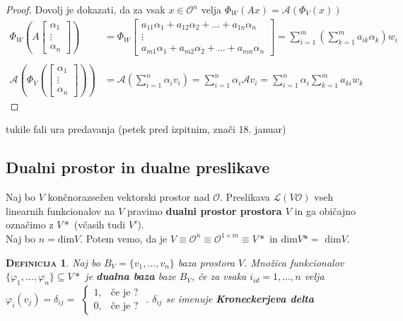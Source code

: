 \documentclass[a4paper,12pt]{article}
\newcommand{\OO}{\mathcal{O}}
\newcommand{\LL}{\mathcal{L}}
\newtheorem*{definicija}{\textsc{Definicija}}
\begin{document}
\begin{proof}
	Dovolj je dokazati, da za vsak $x\in \OO^n$ velja $\Phi_W(Ax)=\mathcal{A}(\Phi_V(x))$ \\

	\begin{align*}
		\Phi_W(A\begin{bmatrix} \alpha_1 \\ \vdots \\ \alpha_n \end{bmatrix}) &= \Phi_W
			\begin{bmatrix}
				a_{11}\alpha_1 + a_{12}\alpha_2+\ldots+a_{1n}\alpha_n \\
				\vdots \\
				a_{m1}\alpha_1+a_{m2}\alpha_2+\ldots+a_{mn}\alpha_n
			\end{bmatrix}
			= \sum_{i=1}^m(\sum_{k=1}^ma_{ik}\alpha_k)w_i \\
			& \\
		\mathcal{A}(\Phi_V(\begin{bmatrix} \alpha_1 \\ \vdots \\ \alpha_n \end{bmatrix})) &= \mathcal{A}(\sum_{i=1}^n\alpha_iv_i)=\sum_{i=1}^n \alpha_i\mathcal{A}v_i=\sum_{i=1}^n\alpha_i\sum_{k=1}^ma_{ki}w_k
	\end{align*}
	
\end{proof}

\newpage 

tukile fali ura predavanja (petek pred izpitnim, znači 18. januar)

\newpage 

\subsection{Dualni prostor in dualne preslikave} 

Naj bo $V$ končnorazsežen vektorski prostor nad $\OO$. Preslikava $\LL(V\OO)$ vseh linearnih funkcionalov na $V$ pravimo \textbf{dualni prostor prostora $V$} in ga običajno označimo z $V*$ (včasih tudi $V'$). \\

Naj bo $n=\text{dim}V$. Potem vemo, da je $V\equiv \OO^n \equiv \OO^{1\times m} \equiv V*$ in dim$V*=$ dim$V$. \\

\begin{definicija}
	Naj bo $B_V=\{v_1,\ldots,v_n\}$ baza prostora $V$. Množica funkcionalov \linebreak $\{\varphi_1,\ldots,\varphi_n\}\subseteq V*$ je \textbf{dualna baza} baze $B_V$, če za vsaka $i_{id}=1,\ldots,n$ velja \linebreak $\varphi_i(v_j)=\delta_{ij}=$
	$\begin{cases}
		1,&\text{če je ? } \\
		0,&\text{če je ? }
	\end{cases}$. $\delta_{ij}$ se imenuje \textbf{Kroneckerjeva delta} \\
\end{definicija}
\end{document}
